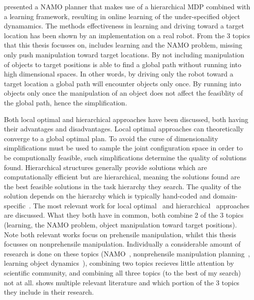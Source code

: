 \citeauthor{scholz_navigation_2016} presented a \ac{NAMO} planner that makes use of a hierarchical \ac{MDP} combined with a learning framework, resulting in online learning of the under-specified object dynamamics. The methods effectiveness in learning and driving toward a target location has been shown by an implementation on a real robot. From the 3 topics that this thesis focusses on, \citeauthor{scholz_navigation_2016} includes learning and the \ac{NAMO} problem, missing only push manipulation toward target locations. By not including manipulation of objects to target positions \citeauthor{scholz_navigation_2016} is able to find a global path without running into high dimensional spaces. In other words, by driving only the robot toward a target location a global path will encounter objects only once. By running into objects only once the manipulation of an object does not affect the feasiblity of the global path, hence the simplification.\bs


Both local optimal and hierarchical approaches have been discussed, both having their advantages and disadvantages. Local optimal approaches can theoretically converge to a global optimal plan. To avoid the curse of dimensionality simplifications must be used to sample the joint configuration space in order to be computionally feasible, such simplifications determine the quality of solutions found. Hierarchical structures generally provide solutions which are computationally efficient but are hierarchical, meaning the solutions found are the best feasible solutions in the task hierarchy they search. The quality of the solution depends on the hierarchy which is typically hand-coded and domain-specific~\cite{vega-brown_asymptotically_2020}. The most relevant work for local optimal~\cite{sabbaghnovin_model_2021} and hierarchical~\cite{scholz_navigation_2016} approaches are discussed. What they both have in common, both combine 2 of the 3 topics (learning, the \ac{NAMO} problem, object manipulation toward target positions). Note both relevant works focus on prehensile manipulation, whilst this thesis focusses on nonprehensile manipulation. Individually a considerable amount of research is done on these topics (\ac{NAMO}~\cite{wang_affordancebased_2020,lavalle_planning_2006,elbanhawi_samplingbased_2014,kingston_samplingbased_2018,chen_fast_2018,ellis_navigation_2022}, nonprehensile manipulation planning~\cite{arruda_uncertainty_2017,mericli_pushmanipulation_2015,toussaint_sequenceofconstraints_2022,stuber_let_2020,stuber_featurebased_2018,bauza_dataefficient_2018}, learning object dynamics~\cite{seegmiller_vehicle_2013,cong_selfadapting_2020}), combining two topics recieves little attention by scientific community, and combining all three topics (to the best of my search) not at all.  shows multiple relevant literature and which portion of the 3 topics they include in their research.\bs

